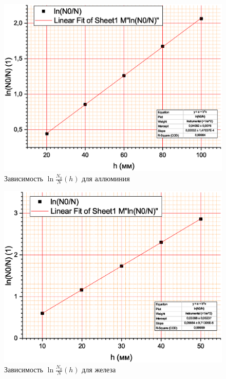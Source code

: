 \documentclass[a4paper]{article}
\begin{document}
\begin{figure}
	\centering
	\includegraphics[width=1.0\linewidth]{Al}
	\caption{Зависимость $\ln \frac{N_0}{N} (h)$ для аллюминия}
	\label{fig:al}
\end{figure}

\begin{figure}
	\centering
	\includegraphics[width=1.0\linewidth]{Fe}
	\caption{Зависимость $\ln \frac{N_0}{N} (h)$ для железа}
	\label{fig:fe}
\end{figure}
\end{document}
